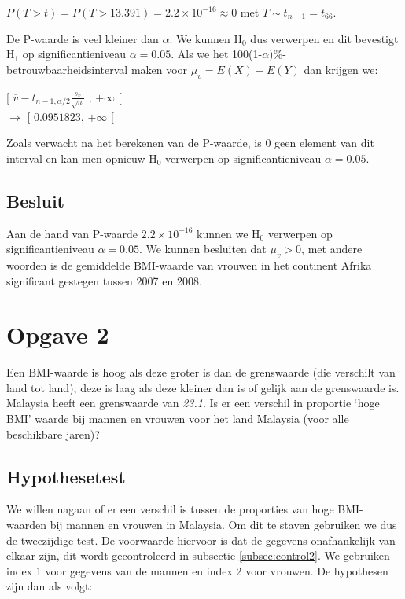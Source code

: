 \documentclass[11pt]{article}
\begin{document}
\begin{center}
$P(T > t) = P(T > 13.391) = 2.2 \times 10^{-16} \approx 0$ met $T \sim t_{n-1} = t_{66}$. 
\end{center}

De P-waarde is veel kleiner dan $\alpha$. We kunnen H$_{0}$ dus verwerpen en dit bevestigt H$_{1}$ op significantieniveau $\alpha=0.05$.
Als we het 100(1-$\alpha$)\%-betrouwbaarheidsinterval maken voor $\mu_{v}=E(X)-E(Y)$ dan krijgen we:

\begin{center}
[ $\overline{v}-t_{n-1,\alpha/2}\frac{s_{v}}{\sqrt{n}}$ , $+\infty$ [\\
$\longrightarrow$
[ $0.0951823$, $+\infty$ [
\end{center}

Zoals verwacht na het berekenen van de P-waarde, is $0$ geen element van dit interval en kan men opnieuw H$_{0}$ verwerpen op significantieniveau $\alpha=0.05$.

\subsection{Besluit}
Aan de hand van P-waarde $2.2 \times 10^{-16}$ kunnen we H$_{0}$ verwerpen op significantieniveau $\alpha=0.05$. We kunnen besluiten dat $\mu_{v} > 0 $, met andere woorden is de gemiddelde BMI-waarde van vrouwen in het continent Afrika significant gestegen tussen 2007 en 2008.

\section{Opgave 2}
Een BMI-waarde is hoog als deze groter is dan de grenswaarde (die verschilt van land tot land), deze is laag als deze kleiner dan is of gelijk aan de grenswaarde is. Malaysia heeft een grenswaarde van {\it 23.1}. Is er een verschil in proportie ‘hoge BMI’ waarde bij mannen en vrouwen voor het land Malaysia (voor alle beschikbare jaren)?

\subsection{Hypothesetest}
We willen nagaan of er een verschil is tussen de proporties van hoge BMI-waarden bij mannen en vrouwen in Malaysia. Om dit te staven gebruiken we dus de tweezijdige test. De voorwaarde hiervoor is dat de gegevens onafhankelijk van elkaar zijn, dit wordt gecontroleerd in subsectie \ref{subsec:control2}. We gebruiken index 1 voor gegevens van de mannen en index 2 voor vrouwen. De hypothesen zijn dan als volgt:
\end{document}
